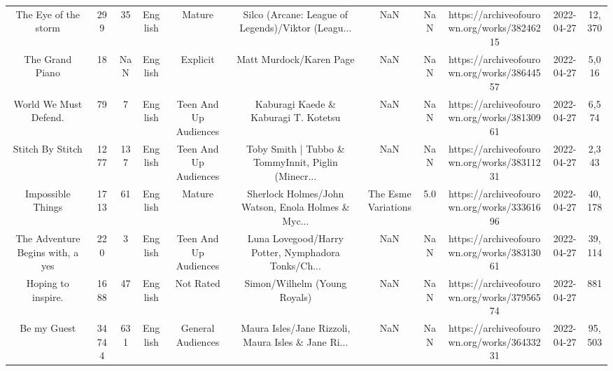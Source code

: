 \begin{table}[h!]
{\begin{tabular}{|c|c|c|c|c|c|c|c|c|c|c|}
                              The Eye of the storm &    299 &    35 &  English &                Mature & Silco (Arcane: League of Legends)/Viktor (Leagu... &                                                NaN &   NaN & https://archiveofourown.org/works/38246215 & 2022-04-27 &    12,370 \\
                                   The Grand Piano &     18 &   NaN &  English &              Explicit &                            Matt Murdock/Karen Page &                                                NaN &   NaN & https://archiveofourown.org/works/38644557 & 2022-04-27 &     5,016 \\
                             World We Must Defend. &     79 &     7 &  English & Teen And Up Audiences &               Kaburagi Kaede \& Kaburagi T. Kotetsu &                                                NaN &   NaN & https://archiveofourown.org/works/38130961 & 2022-04-27 &     6,574 \\
                                  Stitch By Stitch &   1277 &   137 &  English & Teen And Up Audiences & Toby Smith | Tubbo \& TommyInnit, Piglin (Minecr... &                                                NaN &   NaN & https://archiveofourown.org/works/38311231 & 2022-04-27 &     2,343 \\
                                 Impossible Things &   1713 &    61 &  English &                Mature & Sherlock Holmes/John Watson, Enola Holmes \& Myc... &                                The Esme Variations &   5.0 & https://archiveofourown.org/works/33361696 & 2022-04-27 &    40,178 \\
                  The Adventure Begins with, a yes &    220 &     3 &  English & Teen And Up Audiences & Luna Lovegood/Harry Potter, Nymphadora Tonks/Ch... &                                                NaN &   NaN & https://archiveofourown.org/works/38313061 & 2022-04-27 &    39,114 \\
                                Hoping to inspire. &   1688 &    47 &  English &             Not Rated &                       Simon/Wilhelm (Young Royals) &                                                NaN &   NaN & https://archiveofourown.org/works/37956574 & 2022-04-27 &       881 \\
                                       Be my Guest &  34744 &   631 &  English &     General Audiences & Maura Isles/Jane Rizzoli, Maura Isles \& Jane Ri... &                                                NaN &   NaN & https://archiveofourown.org/works/36433231 & 2022-04-27 &    95,503 \\

\end{tabular}}
\end{table}
